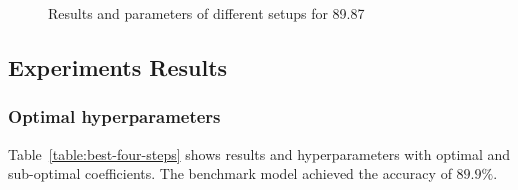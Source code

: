\begin{figure}
    \caption{Results and parameters of different setups for 89.87}
    \label{fig:acc-iter}
\end{figure}

\subsection{Experiments Results}
\subsubsection{Optimal hyperparameters}

Table~\ref{table:best-four-steps} shows results and hyperparameters with optimal and sub-optimal coefficients. The benchmark model achieved the accuracy of $89.9\%$.

